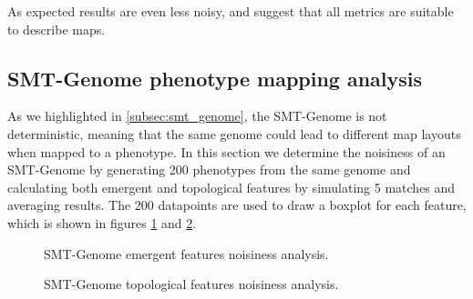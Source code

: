 \documentclass{Configuration_Files/PoliMi3i_thesis}
\begin{document}
As expected results are even less noisy, and suggest that all metrics are suitable to describe maps. 

\subsection{SMT-Genome phenotype mapping analysis}
\label{subsec:smt_genome_phenotype_mapping}
As we highlighted in \ref{subsec:smt_genome}, the SMT-Genome is not deterministic, meaning that the same genome could lead to different map layouts when mapped to a phenotype. In this section we determine the noisiness of an SMT-Genome by generating 200 phenotypes from the same genome and calculating both emergent and topological features by simulating 5 matches and averaging results. The 200 datapoints are used to draw a boxplot for each feature, which is shown in figures \ref{fig:smt_genome_noisiness_emergent} and \ref{fig:smt_genome_noisiness_topology}.

\begin{figure}[hbt!]
    \centering
    \caption{SMT-Genome emergent features noisiness analysis.}
    \label{fig:smt_genome_noisiness_emergent}
\end{figure}
\begin{figure}[hbt!]
    \centering
    \caption{SMT-Genome topological features noisiness analysis.}
    \label{fig:smt_genome_noisiness_topology}
\end{figure}
\end{document}
